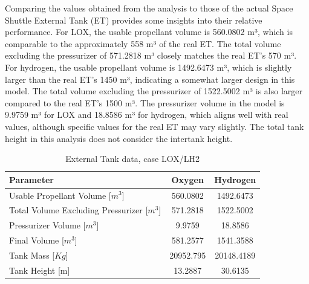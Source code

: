 Comparing the values obtained from the analysis to those of the actual Space Shuttle External Tank (ET) provides some insights into their relative performance. For LOX, the usable propellant volume is 560.0802 m³, which is comparable to the approximately 558 m³ of the real ET. The total volume excluding the pressurizer of 571.2818 m³ closely matches the real ET's 570 m³.
For hydrogen, the usable propellant volume is 1492.6473 m³, which is slightly larger than the real ET's 1450 m³, indicating a somewhat larger design in this model. The total volume excluding the pressurizer of 1522.5002 m³ is also larger compared to the real ET's 1500 m³.
The pressurizer volume in the model is 9.9759 m³ for LOX and 18.8586 m³ for hydrogen, which aligns well with real values, although specific values for the real ET may vary slightly.
The total tank height in this analysis does not consider the intertank height.

\begin{table}[h!]
\centering
\begin{tabular}{|l|c|c|}
\hline
\textbf{Parameter} & \textbf{Oxygen} & \textbf{Hydrogen} \\ \hline
Usable Propellant Volume [$m^3$]& 560.0802 & 1492.6473 \\ \hline
Total Volume Excluding Pressurizer [$m^3$] & 571.2818 & 1522.5002 \\ \hline
Pressurizer Volume [$m^3$] & 9.9759 & 18.8586 \\ \hline
Final Volume [$m^3$] & 581.2577 & 1541.3588 \\ \hline
Tank Mass [$Kg$] & 20952.795 & 20148.4189 \\ \hline
Tank Height [m] & 13.2887 & 30.6135 \\ \hline
\end{tabular}
\caption{External Tank data, case LOX/LH2}
\label{tab:propellant_data}
\end{table}

